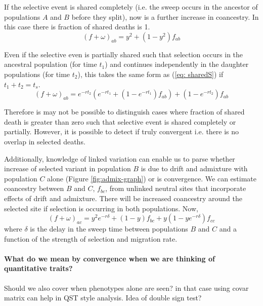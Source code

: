 \documentclass[a4paper,10pt]{article}
\begin{document}
If the selective event is shared completely (i.e. the sweep occurs in the ancestor of populations $A$ and $B$ before they split), now is a further increase in coancestry. In this case there is fraction of shared deaths is 1.
\begin{equation} \label{eq: sharedS}
(f+\omega)_{ab} = y^2 + (1-y^2) f_{ab}
\end{equation}

Even if the selective even is partially shared such that selection occurs in the ancestral population (for time $t_1$) and continues independently in the daughter populations (for time $t_2$), this takes the same form as (\ref{eq: sharedS}) if $t_1 + t_2 = t_s$.
\begin{equation} \label{eq: sharedS}
(f+\omega)_{ab} = e^{-rt_2}\left(e^{-rt_1} + (1-e^{-rt_1})f_{ab}\right) + (1-e^{-rt_2})f_{ab}
\end{equation}

Therefore is may not be possible to distinguish cases where fraction of shared death is greater than zero such that selective event is shared completely or partially. However, it is possible to detect if truly convergent i.e. there is no overlap in selected deaths.

Additionally, knowledge of linked variation can enable us to parse whether increase of selected variant in population $B$ is due to drift and admixture with population $C$ alone (Figure \ref{fig:admix-graph}) or is convergence. We can estimate coancestry between $B$ and $C$, $f_{bc}$, from unlinked neutral sites that incorporate effects of drift and admixture. There will be increased coancestry around the selected site if selection is occurring in both populations. Now, 
\begin{equation} \label{eq: sharedS}
(f+\omega)_{ac} = y^2e^{-r\delta} + (1-y)f_{bc} + y(1-ye^{-r\delta})f_{cc}
\end{equation}
where $\delta$ is the delay in the sweep time between populations $B$ and $C$ and a function of the strength of selection and migration rate.

\paragraph{What do we mean by convergence when we are thinking of quantitative traits?}
Should we also cover when phenotypes alone are seen? in that case using covar matrix can help in QST style analysis.
Idea of double sign test?
\end{document}
